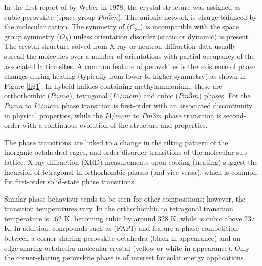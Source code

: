 In the first report of  by Weber in 1978, the crystal structure was assigned as cubic perovskite (space group $Pm\bar{3}m$).\autocite{Weber1978,Weber1978a}
The anionic  network is charge balanced by the   molecular cation.
The symmetry of   ($C_{3v}$) is incompatible with the space group symmetry ($O_h$) unless orientation disorder (static or dynamic) is present.
The crystal structure solved from X-ray or neutron diffraction data usually spread the molecules over a number of orientations with partial occupancy of the associated lattice sites.
A common feature of perovskites is the existence of phase changes during heating (typically from lower to higher symmetry) as shown in Figure \ref{fig1}. 
In hybrid halides containing methylammonium, these are orthorhombic ($Pnma$), tetragonal ($I4/mcm$) and cubic ($Pm\bar{3}m$) phases.\autocite{Weller2015} 
%
For  the $Pnma$ to $I4/mcm$ phase transition is first-order with an associated discontinuity in physical properties, while the $I4/mcm$ to $Pm\bar{3}m$ phase transition is second-order with a continuous evolution of the structure and properties.\autocite{Onoda-Yamamuro1990,Weller2015}

The phase transitions are linked to a change in the tilting pattern of the inorganic octahedral cages, and order-disorder transitions of the molecular sub-lattice.\autocite{Onoda-Yamamuro1990,Yamamuro1992a,Onoda-yamamuro1992}
X-ray diffraction (XRD) measurements upon cooling (heating) suggest the incursion of tetragonal in orthorhombic phases (and vice versa),\autocite{Hutter2016a}
which is common for first-order solid-state phase transitions. 

Similar phase behaviour tends to be seen for other compositions; however, the transition temperatures vary.
In  the orthorhombic to tetragonal transition temperature is $162$ K, becoming cubic by around $328$ K,
while  is cubic above $237$ K.\autocite{Poglitsch1987c} 
%
In addition, compounds such as  (FAPI) and  feature a phase competition between a corner-sharing perovskite octahedra (black in appearance) and an edge-sharing octahedra molecular crystal (yellow or white in appearance).\autocite{Weller2015b}
Only the corner-sharing perovskite phase is of interest for solar energy applications. 

